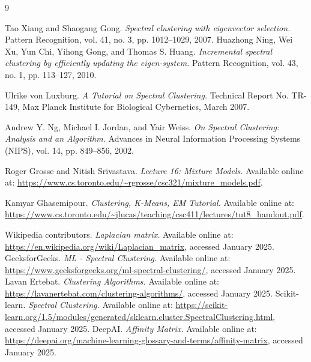 \documentclass[a4paper,12pt,openany]{report}
\begin{document}
	\begin{flushleft} 
		\begin{thebibliography}{9}
			
			Tao Xiang and Shaogang Gong. \textit{Spectral clustering with eigenvector selection.} Pattern Recognition, vol. 41, no. 3, pp. 1012--1029, 2007.
			Huazhong Ning, Wei Xu, Yun Chi, Yihong Gong, and Thomas S. Huang.
			\textit{Incremental spectral clustering by efficiently updating the eigen-system.}
			Pattern Recognition, vol. 43, no. 1, pp. 113--127, 2010.
			
			
			Ulrike von Luxburg.
			\textit{A Tutorial on Spectral Clustering.} 
			Technical Report No. TR-149, Max Planck Institute for Biological Cybernetics, March 2007.
			
			Andrew Y. Ng, Michael I. Jordan, and Yair Weiss.
			\textit{On Spectral Clustering: Analysis and an Algorithm.} 
			Advances in Neural Information Processing Systems (NIPS), vol. 14, pp. 849--856, 2002.
			
			
			Roger Grosse and Nitish Srivastava.
			\textit{Lecture 16: Mixture Models.} 
			Available online at: \url{https://www.cs.toronto.edu/~rgrosse/csc321/mixture_models.pdf}.
			
			
			Kamyar Ghasemipour.
			\textit{Clustering, K-Means, EM Tutorial.} 
			Available online at: \url{https://www.cs.toronto.edu/~jlucas/teaching/csc411/lectures/tut8_handout.pdf}.
			
			Wikipedia contributors.
			\textit{Laplacian matrix.} 
			Available online at: \url{https://en.wikipedia.org/wiki/Laplacian_matrix}, accessed January 2025.
			GeeksforGeeks.
			\textit{ML - Spectral Clustering.} 
			Available online at: \url{https://www.geeksforgeeks.org/ml-spectral-clustering/}, accessed January 2025.
			Lavan Ertebat.
			\textit{Clustering Algorithms.} 
			Available online at: \url{https://lavanertebat.com/clustering-algorithms/}, accessed January 2025.
			Scikit-learn.
			\textit{Spectral Clustering.} 
			Available online at: \url{https://scikit-learn.org/1.5/modules/generated/sklearn.cluster.SpectralClustering.html}, accessed January 2025.
			DeepAI.
			\textit{Affinity Matrix.} 
			Available online at: \url{https://deepai.org/machine-learning-glossary-and-terms/affinity-matrix}, accessed January 2025.
		\end{thebibliography}
	\end{flushleft} 
	
	
\end{document}
